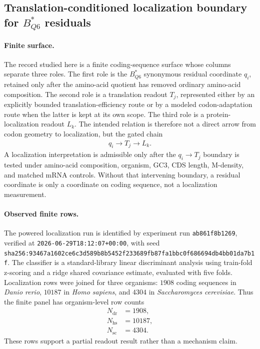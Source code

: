 
\subsection{Translation-conditioned localization boundary for $B^{*}_{Q6}$ residuals}
\label{sec:translation-conditioned-localization-boundary-bstar-q6}

\paragraph{Finite surface.}
The record studied here is a finite coding-sequence surface whose columns separate three roles. The first role is the $B^{*}_{Q6}$ synonymous residual coordinate $q_i$, retained only after the amino-acid quotient has removed ordinary amino-acid composition. The second role is a translation readout $T_j$, represented either by an explicitly bounded translation-efficiency route or by a modeled codon-adaptation route when the latter is kept at its own scope. The third role is a protein-localization readout $L_k$. The intended relation is therefore not a direct arrow from codon geometry to localization, but the gated chain
$$\begin{aligned}
q_i \longrightarrow T_j \longrightarrow L_k.
\end{aligned}$$
A localization interpretation is admissible only after the $q_i \to T_j$ boundary is tested under amino-acid composition, organism, GC3, CDS length, M-density, and matched mRNA controls. Without that intervening boundary, a residual coordinate is only a coordinate on coding sequence, not a localization measurement.

\paragraph{Observed finite rows.}
The powered localization run is identified by experiment run \texttt{ab861f8b1269}, verified at \texttt{2026-06-29T18:12:07+00:00}, with seed \texttt{sha256:93467a1602ce6c3d589b8b5452f233689fb87fa1bbc0f686694db4bb01da7b1f}. The classifier is a standard-library linear discriminant analysis using train-fold z-scoring and a ridge shared covariance estimate, evaluated with five folds. Localization rows were joined for three organisms: $1908$ coding sequences in \textit{Danio rerio}, $10187$ in \textit{Homo sapiens}, and $4304$ in \textit{Saccharomyces cerevisiae}. Thus the finite panel has organism-level row counts
$$\begin{aligned}
N_{\mathrm{dr}} &= 1908,\\
N_{\mathrm{hs}} &= 10187,\\
N_{\mathrm{sc}} &= 4304.
\end{aligned}$$
These rows support a partial readout result rather than a mechanism claim.

